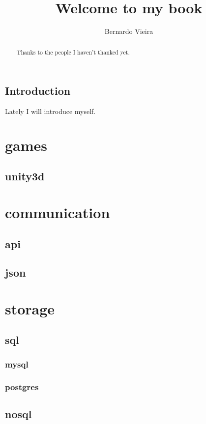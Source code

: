 \documentclass{report}
\begin{document}
\title{Welcome to my book}
\author{Bernardo Vieira}

\maketitle

\begin{abstract}
Thanks to the people I haven't thanked yet.
\end{abstract}

\section{Introduction}
Lately I will introduce myself.

\chapter{games}
\section{unity3d}


\chapter{communication}
\section{api}
\section{json}

\chapter{storage}
\section{sql}
\subsection{mysql}
\subsection{postgres}

\section{nosql}
\end{document}
